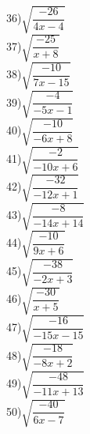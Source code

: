 \documentclass[12pt,a4paper]{article}
\begin{document}
36)$\sqrt{\dfrac{-26}{4x-4}}$\\
37)$\sqrt{\dfrac{-25}{x+8}}$\\
38)$\sqrt{\dfrac{-10}{7x-15}}$\\
39)$\sqrt{\dfrac{-4}{-5x-1}}$\\
40)$\sqrt{\dfrac{-10}{-6x+8}}$\\
41)$\sqrt{\dfrac{-2}{-10x+6}}$\\
42)$\sqrt{\dfrac{-32}{-12x+1}}$\\
43)$\sqrt{\dfrac{-8}{-14x+14}}$\\
44)$\sqrt{\dfrac{-10}{9x+6}}$\\
45)$\sqrt{\dfrac{-38}{-2x+3}}$\\
46)$\sqrt{\dfrac{-30}{x+5}}$\\
47)$\sqrt{\dfrac{-16}{-15x-15}}$\\
48)$\sqrt{\dfrac{-18}{-8x+2}}$\\
49)$\sqrt{\dfrac{-48}{-11x+13}}$\\
50)$\sqrt{\dfrac{-40}{6x-7}}$\\
	
	
	
	
	
	
	
	
	
	
	
\end{document}
